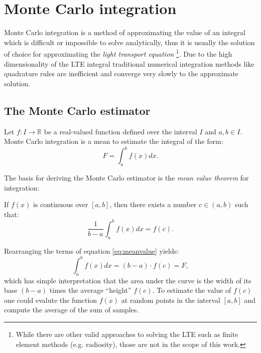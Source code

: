 \chapter{Monte Carlo integration}
Monte Carlo integration is a method of approximating the value of an integral which is difficult or impossible to solve analytically, thus it is usually the solution of choice for approximating the \emph{light transport equation} \footnote{While there are other valid approaches to solving the LTE such as finite element methods (e.g. radiosity), those are not in the scope of this work.}. Due to the high dimensionality of the LTE integral traditional numerical integration methods like quadrature rules are inefficient and converge very slowly to the approximate solution.

\section{The Monte Carlo estimator}
Let $f: I \rightarrow \mathbb{R}$ be a real-valued function defined over the interval $I$ and $a,b \in I$. Monte Carlo integration is a mean to estimate the integral of the form:
\begin{equation}
  F = \int_{a}^{b} f(x)dx.
\end{equation}

The basis for deriving the Monte Carlo estimator is the \emph{mean value theorem} for integration:
\begin{thm}
If $f(x)$ is continuous over $[a, b]$, then there exists a number $c \in (a, b)$ such that:
\begin{equation}
\label{eq:meanvalue}
  \frac{1}{b-a} \int_{a}^{b} f(x)dx = f(c).
\end{equation}
\end{thm}
Rearranging the terms of equation \ref{eq:meanvalue} yields:
\begin{equation}
  \int_{a}^{b} f(x)dx = (b-a) \cdot f(c) = F,
\end{equation}
which has simple interpretation that the area under the curve is the width of its base $(b-a)$ times the average ``height'' $f(c)$. To estimate the value of $f(c)$ one could evalute the function $f(x)$ at random points in the interval $[a,b]$ and compute the average of the sum of samples.

